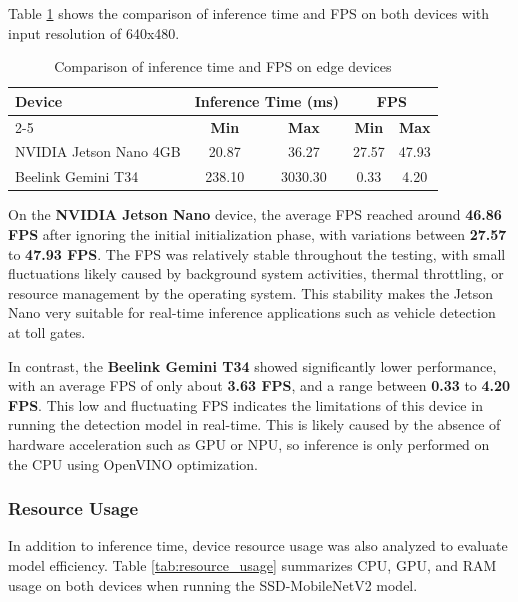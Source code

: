 Table \ref{tab:inference_time} shows the comparison of inference time and FPS on both devices with input resolution of 640x480.

\begin{table}[htbp]
  \centering
  \setlength{\tabcolsep}{4pt}
  \footnotesize
  \begin{tabular}{|l|c|c|c|c|}
  \hline
  \rowcolor[HTML]{C0C0C0}
  \textbf{Device} & \multicolumn{2}{c|}{\textbf{Inference Time (ms)}} & \multicolumn{2}{c|}{\textbf{FPS}} \\
  \cline{2-5}
  \rowcolor[HTML]{C0C0C0}
  & \textbf{Min} & \textbf{Max} & \textbf{Min} & \textbf{Max} \\
  \hline
  NVIDIA Jetson Nano 4GB & 20.87 & 36.27 & 27.57 & 47.93 \\
  \hline
  Beelink Gemini T34 & 238.10 & 3030.30 & 0.33 & 4.20 \\
  \hline
  \end{tabular}
  \caption{Comparison of inference time and FPS on edge devices}
  \label{tab:inference_time}
\end{table}

On the \textbf{NVIDIA Jetson Nano} device, the average FPS reached around \textbf{46.86 FPS} after ignoring the initial initialization phase, with variations between \textbf{27.57} to \textbf{47.93 FPS}. The FPS was relatively stable throughout the testing, with small fluctuations likely caused by background system activities, thermal throttling, or resource management by the operating system. This stability makes the Jetson Nano very suitable for real-time inference applications such as vehicle detection at toll gates.

In contrast, the \textbf{Beelink Gemini T34} showed significantly lower performance, with an average FPS of only about \textbf{3.63 FPS}, and a range between \textbf{0.33} to \textbf{4.20 FPS}. This low and fluctuating FPS indicates the limitations of this device in running the detection model in real-time. This is likely caused by the absence of hardware acceleration such as GPU or NPU, so inference is only performed on the CPU using OpenVINO optimization.

\subsubsection{Resource Usage}

In addition to inference time, device resource usage was also analyzed to evaluate model efficiency. Table \ref{tab:resource_usage} summarizes CPU, GPU, and RAM usage on both devices when running the SSD-MobileNetV2 model.

